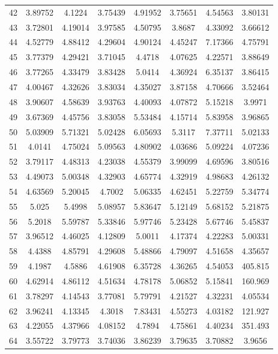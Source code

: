 \begin{center}
\begin{longtable}{cccccccc}
42 & 3.89752 & 4.1224 & 3.75439 & 4.91952 & 3.75651 & 4.54563 & 3.80131\\
43 & 3.72801 & 4.19014 & 3.97585 & 4.50795 & 3.8687 & 4.33092 & 3.66612\\
44 & 4.52779 & 4.88412 & 4.29604 & 4.90124 & 4.45247 & 7.17366 & 4.75791\\
45 & 3.77379 & 4.29421 & 3.71045 & 4.4718 & 4.07625 & 4.22571 & 3.88649\\
46 & 3.77265 & 4.33479 & 3.83428 & 5.0414 & 4.36924 & 6.35137 & 3.86415\\
47 & 4.00467 & 4.32626 & 3.83034 & 4.35027 & 3.87158 & 4.70666 & 3.52464\\
48 & 3.90607 & 4.58639 & 3.93763 & 4.40093 & 4.07872 & 5.15218 & 3.9971\\
49 & 3.67369 & 4.45756 & 3.83058 & 5.53484 & 4.15714 & 5.83958 & 3.96865\\
50 & 5.03909 & 5.71321 & 5.02428 & 6.05693 & 5.3117 & 7.37711 & 5.02133\\
51 & 4.0141 & 4.75024 & 5.09563 & 4.80902 & 4.03686 & 5.09224 & 4.07236\\
52 & 3.79117 & 4.48313 & 4.23038 & 4.55379 & 3.99099 & 4.69596 & 3.80516\\
53 & 4.49073 & 5.00348 & 4.32903 & 4.65774 & 4.32919 & 4.98683 & 4.26132\\
54 & 4.63569 & 5.20045 & 4.7002 & 5.06335 & 4.62451 & 5.22759 & 5.34774\\
55 & 5.025 & 5.4998 & 5.08957 & 5.83647 & 5.12149 & 5.68152 & 5.21875\\
56 & 5.2018 & 5.59787 & 5.33846 & 5.97746 & 5.23428 & 5.67746 & 5.45837\\
57 & 3.96512 & 4.46025 & 4.12809 & 5.0011 & 4.17374 & 4.22283 & 5.00331\\
58 & 4.4388 & 4.85791 & 4.29608 & 5.48866 & 4.79097 & 4.51658 & 4.35657\\
59 & 4.1987 & 4.5886 & 4.61908 & 6.35728 & 4.36265 & 4.54053 & 405.815\\
60 & 4.62914 & 4.86112 & 4.51634 & 4.78178 & 5.06852 & 5.15841 & 160.969\\
61 & 3.78297 & 4.14543 & 3.77081 & 5.79791 & 4.21527 & 4.32231 & 4.05534\\
62 & 3.96241 & 4.13345 & 4.3018 & 7.83431 & 4.55273 & 4.03182 & 121.927\\
63 & 4.22055 & 4.37966 & 4.08152 & 4.7894 & 4.75861 & 4.40234 & 351.493\\
64 & 3.55722 & 3.79773 & 3.74036 & 3.86239 & 3.79635 & 3.70882 & 3.9656\\

\end{longtable}
\end{center}

